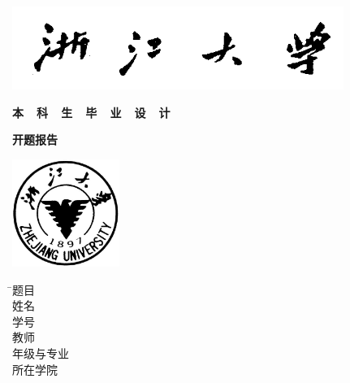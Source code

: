 
\thispagestyle{empty}

\vspace{5mm}

\begin{center}
   \includegraphics[width=108mm]{images/zjdx}
\end{center}
\vspace{5mm}

\centerline{\heiti\xiaoyi\textbf{本~~科~~生~~毕~~业~~设~~计}}
\vspace{3mm}
\centerline{\heiti\xiaoyi\textbf{开题报告}}
\vspace{6mm}

\begin{center}
  \includegraphics[width=35mm]{images/standxb}
\end{center}

\vspace{10mm}

{

\begin{spacing}{1.7}
\begin{tabbing}
    \hspace{30mm} \= \songti\sanhao 题目 \= \underline{\makebox[7cm]{\sanhao\zjutitlec}} \\[2mm]
    \> \songti\sanhao 姓名 \> \underline{\makebox[7cm]{\sanhao\zjuauthornamec}} \\[2mm]
    \> \songti\sanhao 学号 \> \underline{\makebox[7cm]{\sanhao\zjuauthorid}} \\[2mm]
    \> \songti\sanhao 教师 \> \underline{\makebox[7cm]{\sanhao\zjumentorc}} \\[2mm]
    \> \songti\sanhao 年级与专业 \> \makebox[12cm]{\underline{\hspace{7mm}\sanhao\zjugrade\hspace{2mm}\zjumajor\hspace{7mm}}} \\[2mm]
    \> \songti\sanhao 所在学院 \> \makebox[11cm]{\underline{\hspace{13mm}\sanhao\zjucollegec\hspace{13mm}}}
\end{tabbing}
\end{spacing}
}

